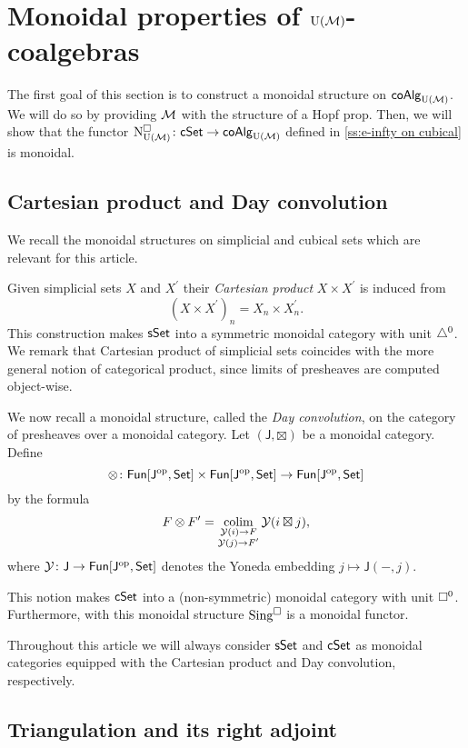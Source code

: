 
\section{Monoidal properties of \texorpdfstring{${\operatorname{U}(\mathcal{M})}$}{}-coalgebras} \label{s:monoidal}

The first goal of this section is to construct a monoidal structure on $\mathsf{coAlg}_{\operatorname{U}(\mathcal{M})}$.
We will do so by providing $\mathcal{M}$ with the structure of a Hopf prop.
Then, we will show that the functor $\operatorname{N^{\square}_{{\operatorname{U}(\mathcal{M})}}} \colon \mathsf{cSet} \to \mathsf{coAlg}_{{\operatorname{U}(\mathcal{M})}}$ defined in \cref{ss:e-infty on cubical} is monoidal.

\subsection{Cartesian product and Day convolution} \label{ss:day convolution}

We recall the monoidal structures on simplicial and cubical sets which are relevant for this article.

Given simplicial sets $X$ and $X^\prime$ their \textit{Cartesian product} $X \times X^\prime$ is induced from
\[
(X \times X^\prime)_n = X_n \times X^\prime_n.
\]
This construction makes $\mathsf{sSet}$ into a symmetric monoidal category with unit $\triangle^0$. We remark that Cartesian product of simplicial sets coincides with the more general notion of categorical product, since limits of presheaves are computed object-wise.

We now recall a monoidal structure, called the \textit{Day convolution}, on the category of presheaves over a monoidal category. Let $(\mathsf{J}, \boxtimes)$ be a monoidal category. Define 
\[ 
\otimes \colon \mathsf{Fun}[\mathsf{J}^{\mathrm{op}}, \mathsf{Set}] \times \mathsf{Fun}[\mathsf{J}^{\mathrm{op}}, \mathsf{Set}]\to \mathsf{Fun}[\mathsf{J}^{\mathrm{op}}, \mathsf{Set}]
\]
by the formula
\[
F \otimes F^\prime = \operatorname*{colim}_{\substack{\mathcal{Y}(i) \to F \\ \mathcal{Y}(j) \to F^\prime}} \mathcal{Y}(i \boxtimes j),
\]
where $\mathcal{Y} \colon \mathsf{J} \to \mathsf{Fun}[\mathsf{J}^{\mathrm{op}}, \mathsf{Set}]$ denotes the Yoneda embedding $j \mapsto \mathsf{J}(-,j)$.

This notion makes $\mathsf{cSet}$ into a (non-symmetric) monoidal category with unit $\square^0$. Furthermore, with this monoidal structure $\operatorname{Sing^{\square}}$ is a monoidal functor.

Throughout this article we will always consider $\mathsf{sSet}$ and $\mathsf{cSet}$ as monoidal categories equipped with the Cartesian product and Day convolution, respectively. 

\subsection{Triangulation and its right adjoint} \label{ss:triangulation and its adjoint}

